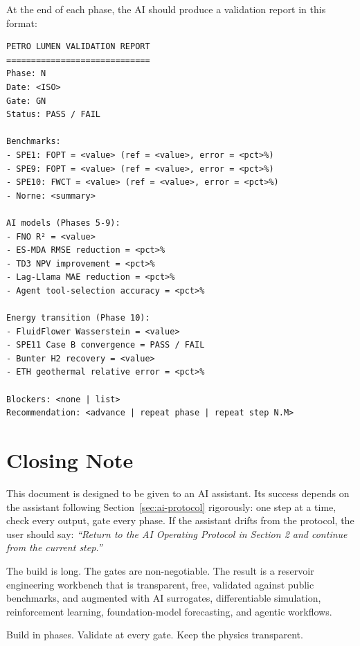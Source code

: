 \documentclass[10pt,a4paper]{article}
\begin{document}
At the end of each phase, the AI should produce a validation report in this format:

\begin{lstlisting}[style=txt]
PETRO LUMEN VALIDATION REPORT
=============================
Phase: N
Date: <ISO>
Gate: GN
Status: PASS / FAIL

Benchmarks:
- SPE1: FOPT = <value> (ref = <value>, error = <pct>%)
- SPE9: FOPT = <value> (ref = <value>, error = <pct>%)
- SPE10: FWCT = <value> (ref = <value>, error = <pct>%)
- Norne: <summary>

AI models (Phases 5-9):
- FNO R² = <value>
- ES-MDA RMSE reduction = <pct>%
- TD3 NPV improvement = <pct>%
- Lag-Llama MAE reduction = <pct>%
- Agent tool-selection accuracy = <pct>%

Energy transition (Phase 10):
- FluidFlower Wasserstein = <value>
- SPE11 Case B convergence = PASS / FAIL
- Bunter H2 recovery = <value>
- ETH geothermal relative error = <pct>%

Blockers: <none | list>
Recommendation: <advance | repeat phase | repeat step N.M>
\end{lstlisting}

\section*{Closing Note}

This document is designed to be given to an AI assistant. Its success depends
on the assistant following Section~\ref{sec:ai-protocol} rigorously: one step
at a time, check every output, gate every phase. If the assistant drifts from
the protocol, the user should say: \emph{``Return to the AI Operating Protocol
in Section 2 and continue from the current step.''}

The build is long. The gates are non-negotiable. The result is a reservoir
engineering workbench that is transparent, free, validated against public
benchmarks, and augmented with AI surrogates, differentiable simulation,
reinforcement learning, foundation-model forecasting, and agentic workflows.

Build in phases. Validate at every gate. Keep the physics transparent.
\end{document}
